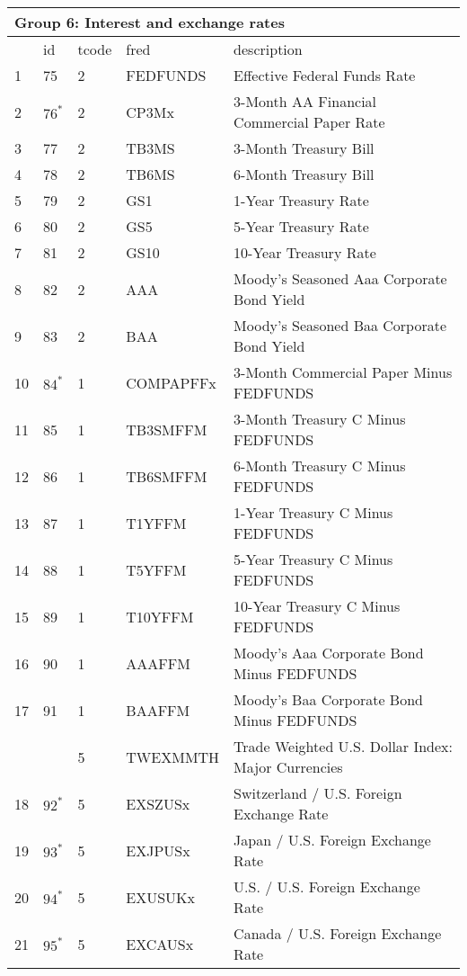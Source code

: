 \begin{table}[ht] 
\centering 
\begin{tabular}{lllll}
\multicolumn{5}{l}{Group 6: Interest and exchange rates} \\
\toprule
 & id & tcode & fred & description \\
\midrule
1 & 75 & 2 & FEDFUNDS & Effective Federal Funds Rate \\
2 & $76^*$ & 2 & CP3Mx & 3-Month AA Financial Commercial Paper Rate \\
3 & 77 & 2 & TB3MS & 3-Month Treasury Bill \\
4 & 78 & 2 & TB6MS & 6-Month Treasury Bill \\
5 & 79 & 2 & GS1 & 1-Year Treasury Rate \\
6 & 80 & 2 & GS5 & 5-Year Treasury Rate \\
7 & 81 & 2 & GS10 & 10-Year Treasury Rate \\
8 & 82 & 2 & AAA & Moody's Seasoned Aaa Corporate Bond Yield \\
9 & 83 & 2 & BAA & Moody's Seasoned Baa Corporate Bond Yield \\
10 & $84^*$ & 1 & COMPAPFFx & 3-Month Commercial Paper Minus FEDFUNDS \\
11 & 85 & 1 & TB3SMFFM & 3-Month Treasury C Minus FEDFUNDS \\
12 & 86 & 1 & TB6SMFFM & 6-Month Treasury C Minus FEDFUNDS \\
13 & 87 & 1 & T1YFFM & 1-Year Treasury C Minus FEDFUNDS \\
14 & 88 & 1 & T5YFFM & 5-Year Treasury C Minus FEDFUNDS \\
15 & 89 & 1 & T10YFFM & 10-Year Treasury C Minus FEDFUNDS \\
16 & 90 & 1 & AAAFFM & Moody's Aaa Corporate Bond Minus FEDFUNDS \\
17 & 91 & 1 & BAAFFM & Moody's Baa Corporate Bond Minus FEDFUNDS \\
\rowcolor{lightgray} & & 5 & TWEXMMTH & Trade Weighted U.S. Dollar Index: Major Currencies \\
18 & $92^*$ & 5 & EXSZUSx & Switzerland / U.S. Foreign Exchange Rate \\
19 & $93^*$ & 5 & EXJPUSx & Japan / U.S. Foreign Exchange Rate \\
20 & $94^*$ & 5 & EXUSUKx & U.S. / U.S. Foreign Exchange Rate \\
21 & $95^*$ & 5 & EXCAUSx & Canada / U.S. Foreign Exchange Rate \\
\bottomrule
\end{tabular}  
\end{table} 